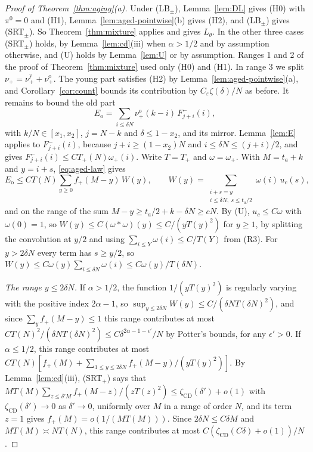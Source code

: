 \begin{proof}[Proof of Theorem~\ref{thm:aging}(a)]
Under (LB$_\pm$), Lemma~\ref{lem:DL} gives (H0) with $\pi^0=0$ and (H1), Lemma~\ref{lem:aged-pointwise}(b)
gives (H2), and (LB$_\pm$) gives (SRT$_\pm$). So Theorem~\ref{thm:mixture} applies and gives
$L_\theta$. In the other three cases (SRT$_\pm$) holds, by Lemma~\ref{lem:cd}(iii) when
$\alpha>1/2$ and by assumption otherwise, and (U) holds by Lemma~\ref{lem:U} or by assumption.
Ranges 1 and 2 of the proof of Theorem~\ref{thm:mixture} used only (H0) and (H1). In range 3
we split $\nu_\plus=\nu^{\mathrm y}_\plus+\nu^{\mathrm o}_\plus$. The young part satisfies (H2)
by Lemma~\ref{lem:aged-pointwise}(a), and Corollary~\ref{cor:count} bounds its contribution by
$C_\varepsilon\zeta(\delta)/N$ as before. It remains to bound the old part
\[
 E_{\mathrm o}=\sum_{i\le\delta N}\nu^{\mathrm o}_\plus(k-i)\,F^\minus_{j+i}(i),
\]
with $k/N\in[x_1,x_2]$, $j=N-k$ and $\delta\le1-x_2$, and its mirror. Lemma~\ref{lem:E} applies
to $F^\minus_{j+i}(i)$, because $j+i\ge(1-x_2)N$ and $i\le\delta N\le(j+i)/2$, and gives
$F^\minus_{j+i}(i)\le CT_\plus(N)\omega_\plus(i)$. Write $T=T_\plus$ and $\omega=\omega_\plus$. With
$M=t_a+k$ and $y=i+s$, \eqref{eq:aged-law} gives
\[
 E_{\mathrm o}\le CT(N)\sum_{y\ge0}f_\plus(M-y)\,W(y),\qquad
 W(y)=\sum_{\substack{i+s=y\\ i\le\delta N,\ s\le t_a/2}}\omega(i)\,u_c(s),
\]
and on the range of the sum $M-y\ge t_a/2+k-\delta N\ge cN$. By (U), $u_c\le C\omega$ with
$\omega(0)=1$, so $W(y)\le C(\omega*\omega)(y)\le C/(yT(y)^2)$ for $y\ge1$, by splitting the
convolution at $y/2$ and using $\sum_{i\le Y}\omega(i)\le C/T(Y)$ from (R3). For $y>2\delta N$
every term has $s\ge y/2$, so $W(y)\le C\omega(y)\sum_{i\le\delta N}\omega(i)\le C\omega(y)/T(\delta N)$.

\emph{The range $y\le2\delta N$.} If $\alpha>1/2$, the function $1/(yT(y)^2)$ is regularly varying
with the positive index $2\alpha-1$, so $\sup_{y\le2\delta N}W(y)\le C/(\delta NT(\delta N)^2)$, and
since $\sum_yf_\plus(M-y)\le1$ this range contributes at most
$CT(N)^2/(\delta NT(\delta N)^2)\le C\delta^{2\alpha-1-\epsilon'}/N$ by Potter's bounds, for any
$\epsilon'>0$. If $\alpha\le1/2$, this range contributes at most
$CT(N)[f_\plus(M)+\sum_{1\le y\le2\delta N}f_\plus(M-y)/(yT(y)^2)]$. By Lemma~\ref{lem:cd}(iii),
(SRT$_\plus$) says that $MT(M)\sum_{z\le\delta'M}f_\plus(M-z)/(zT(z)^2)\le\zeta_{\mathrm{CD}}(\delta')+o(1)$
with $\zeta_{\mathrm{CD}}(\delta')\to0$ as $\delta'\to0$, uniformly over $M$ in a range of order $N$,
and its term $z=1$ gives $f_\plus(M)=o(1/(MT(M)))$. Since $2\delta N\le C\delta M$ and $MT(M)\asymp NT(N)$,
this range contributes at most $C(\zeta_{\mathrm{CD}}(C\delta)+o(1))/N$.


\end{proof}
